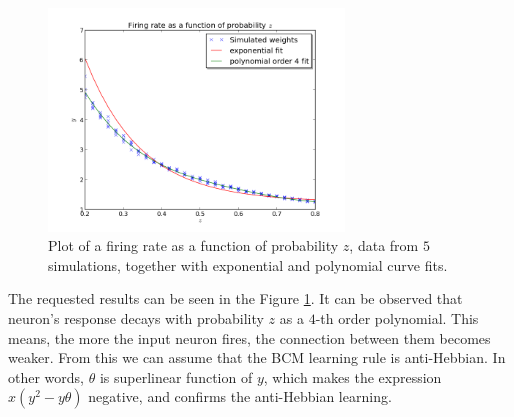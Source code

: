 \begin{figure}[h]
\centering
\includegraphics[width=0.7\textwidth]{figures/ex1-2.png}
\caption{Plot of a firing rate as a function of probability $z$, data from $5$
simulations, together with exponential and polynomial curve fits.}
\label{fig:ex12}
\end{figure}

The requested results can be seen in the Figure \ref{fig:ex12}. It can be
observed that neuron's response decays with probability $z$ as a $4$-th order
polynomial. This means, the more the input neuron fires, the connection between
them becomes weaker. From this we can assume that the BCM learning rule is
anti-Hebbian. In other words, $\theta$ is superlinear function of $y$, which
makes the expression $x(y^2 - y\theta)$ negative, and confirms the
anti-Hebbian learning.

